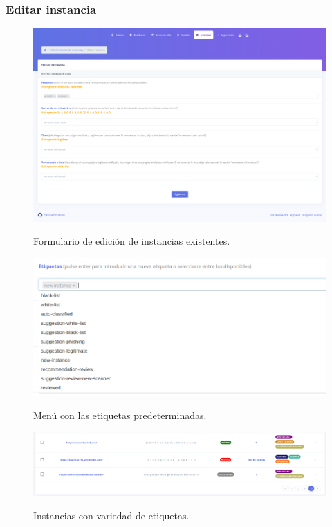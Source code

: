 \subsubsection{Editar instancia}

\begin{figure}[h]
	\caption[Manual de usuario: editar instancia]{Formulario de edición de instancias existentes.}
	\centering
	\includegraphics[width=\textwidth]{../img/anexos/user_guide/6_edit_instance}
	\label{e-5:edit-instance}
\end{figure}

\begin{figure}[h]
	\caption[Manual de usuario: etiquetas predeterminadas]{Menú con las etiquetas predeterminadas.}
	\centering
	\includegraphics[width=\textwidth]{../img/anexos/user_guide/6_labels}
	\label{e-6:labels}
\end{figure}

\begin{figure}[h]
	\caption[Manual de usuario: ejemplos de etiquetas]{Instancias con variedad de etiquetas.}
	\centering
	\includegraphics[width=\textwidth]{../img/anexos/user_guide/6_instances_more_labels}
	\label{e-6:more-labels}
\end{figure}

